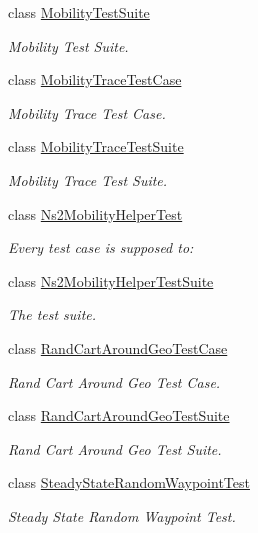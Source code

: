 \begin{DoxyCompactItemize}
class \hyperlink{classMobilityTestSuite}{Mobility\+Test\+Suite}
\begin{DoxyCompactList}\small\item\em Mobility Test Suite. \end{DoxyCompactList}\item 
class \hyperlink{classMobilityTraceTestCase}{Mobility\+Trace\+Test\+Case}
\begin{DoxyCompactList}\small\item\em Mobility Trace Test Case. \end{DoxyCompactList}\item 
class \hyperlink{classMobilityTraceTestSuite}{Mobility\+Trace\+Test\+Suite}
\begin{DoxyCompactList}\small\item\em Mobility Trace Test Suite. \end{DoxyCompactList}\item 
class \hyperlink{classNs2MobilityHelperTest}{Ns2\+Mobility\+Helper\+Test}
\begin{DoxyCompactList}\small\item\em Every test case is supposed to\+: \end{DoxyCompactList}\item 
class \hyperlink{classNs2MobilityHelperTestSuite}{Ns2\+Mobility\+Helper\+Test\+Suite}
\begin{DoxyCompactList}\small\item\em The test suite. \end{DoxyCompactList}\item 
class \hyperlink{classRandCartAroundGeoTestCase}{Rand\+Cart\+Around\+Geo\+Test\+Case}
\begin{DoxyCompactList}\small\item\em Rand Cart Around Geo Test Case. \end{DoxyCompactList}\item 
class \hyperlink{classRandCartAroundGeoTestSuite}{Rand\+Cart\+Around\+Geo\+Test\+Suite}
\begin{DoxyCompactList}\small\item\em Rand Cart Around Geo Test Suite. \end{DoxyCompactList}\item 
class \hyperlink{classSteadyStateRandomWaypointTest}{Steady\+State\+Random\+Waypoint\+Test}
\begin{DoxyCompactList}\small\item\em Steady State Random Waypoint Test. \end{DoxyCompactList}\item 

\end{DoxyCompactItemize}
